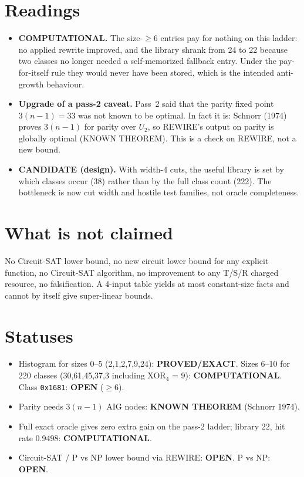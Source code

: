 \documentclass[11pt]{article}
\begin{document}
\section{Readings}
\begin{itemize}
\item \textbf{COMPUTATIONAL.} The size-$\ge6$ entries pay for nothing on this ladder: no applied rewrite improved, and the library shrank from 24 to 22 because two classes no longer needed a self-memorized fallback entry. Under the pay-for-itself rule they would never have been stored, which is the intended anti-growth behaviour.
\item \textbf{Upgrade of a pass-2 caveat.} Pass~2 said that the parity fixed point $3(n-1)=33$ was not known to be optimal. In fact it is: Schnorr (1974) proves $3(n-1)$ for parity over $U_2$, so REWIRE's output on parity is globally optimal (KNOWN THEOREM). This is a check on REWIRE, not a new bound.
\item \textbf{CANDIDATE (design).} With width-4 cuts, the useful library is set by which classes occur (38) rather than by the full class count (222). The bottleneck is now cut width and hostile test families, not oracle completeness.
\end{itemize}

\section{What is not claimed}
No Circuit-SAT lower bound, no new circuit lower bound for any explicit function, no Circuit-SAT algorithm, no improvement to any T/S/R charged resource, no falsification. A 4-input table yields at most constant-size facts and cannot by itself give super-linear bounds.

\section{Statuses}
\begin{itemize}
\item Histogram for sizes 0--5 (2,1,2,7,9,24): \textbf{PROVED/EXACT}. Sizes 6--10 for 220 classes (30,61,45,37,3 including XOR$_4$ = 9): \textbf{COMPUTATIONAL}. Class \texttt{0x1681}: \textbf{OPEN} ($\ge6$).
\item Parity needs $3(n-1)$ AIG nodes: \textbf{KNOWN THEOREM} (Schnorr 1974).
\item Full exact oracle gives zero extra gain on the pass-2 ladder; library 22, hit rate 0.9498: \textbf{COMPUTATIONAL}.
\item Circuit-SAT / P vs NP lower bound via REWIRE: \textbf{OPEN}. P vs NP: \textbf{OPEN}.
\end{itemize}
\end{document}
